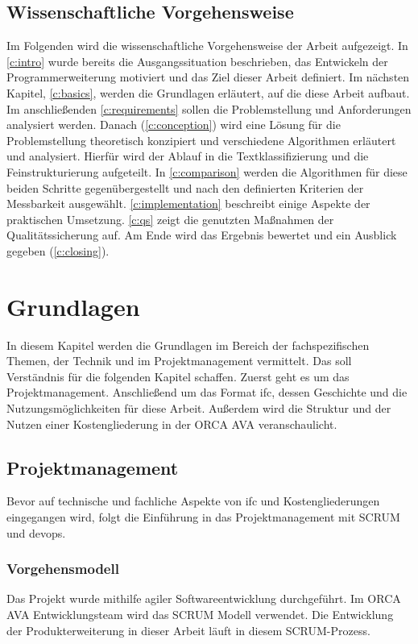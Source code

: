 \section{Wissenschaftliche Vorgehensweise}
\label{c:intro:methodology:scientific_proceture}
Im Folgenden wird die wissenschaftliche Vorgehensweise der Arbeit aufgezeigt.
In \autoref{c:intro} wurde bereits die Ausgangssituation beschrieben, das Entwickeln der Programmerweiterung motiviert und das Ziel dieser Arbeit definiert. Im nächsten Kapitel, \autoref{c:basics}, werden die Grundlagen erläutert, auf die diese Arbeit aufbaut. Im anschließenden \autoref{c:requirements} sollen die Problemstellung und Anforderungen analysiert werden. Danach (\autoref{c:conception}) wird eine Lösung für die Problemstellung theoretisch konzipiert und verschiedene Algorithmen erläutert und analysiert. Hierfür wird der Ablauf in die Textklassifizierung und die Feinstrukturierung aufgeteilt. In \autoref{c:comparison} werden die Algorithmen für diese beiden Schritte gegenübergestellt und nach den definierten Kriterien der Messbarkeit ausgewählt. \autoref{c:implementation} beschreibt einige Aspekte der praktischen Umsetzung. \autoref{c:qs} zeigt die genutzten Maßnahmen der Qualitätssicherung auf. Am Ende wird das Ergebnis bewertet und ein Ausblick gegeben (\autoref{c:closing}).


\chapter{Grundlagen}
\label{c:basics}
In diesem Kapitel werden die Grundlagen im Bereich der fachspezifischen Themen, der Technik und im Projektmanagement vermittelt. Das soll Verständnis für die folgenden Kapitel schaffen. Zuerst geht es um das Projektmanagement. Anschließend um das Format \ac{ifc}, dessen Geschichte und die Nutzungsmöglichkeiten für diese Arbeit. Außerdem wird die Struktur und der Nutzen einer Kostengliederung in der ORCA AVA veranschaulicht.

\section{Projektmanagement}
\label{c:basics:project-management}
Bevor auf technische und fachliche Aspekte von \ac{ifc} und Kostengliederungen eingegangen wird, folgt die Einführung in das Projektmanagement mit SCRUM und \ac{devops}.

\subsection{Vorgehensmodell}
\label{c:basics:project-management:procedure_model}
Das Projekt wurde mithilfe agiler Softwareentwicklung durchgeführt. Im ORCA AVA Entwicklungsteam wird das SCRUM Modell verwendet. Die Entwicklung der Produkterweiterung in dieser Arbeit läuft in diesem SCRUM-Prozess.

